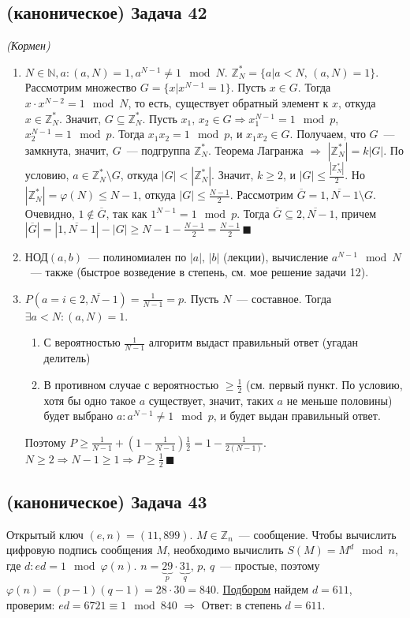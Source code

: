 \documentclass[a4paper]{article}
\newcommand{\ZZ}{\mathbb{Z}}
\newcommand{\NN}{\mathbb{N}}
\begin{document}
\subsection*{(каноническое) Задача 42}
{\em (Кормен)}
\begin{enumerate}
\item $N\in\NN,a\colon (a,N)=1, a^{N-1}\neq 1\mod N$. $\ZZ_N^*=\{a\big|a<N,\,(a,N)=1\}$. Рассмотрим множество $G=\{x\big|x^{N-1}=1\}$. Пусть $x\in G$. Тогда $x\cdot x^{N-2}=1\mod N$, то есть, существует обратный элемент к $x$, откуда $x\in \ZZ_N^*$. Значит, $G\subseteq \ZZ_N^*$. Пусть $x_1,\,x_2\in G\Rightarrow x_1^{N-1}=1\mod p$, $x_2^{N-1}=1\mod p$. Тогда $x_1x_2=1\mod p$, и $x_1x_2\in G$. Получаем, что $G$~--- замкнута, значит, $G$~--- подгруппа $\ZZ_N^*$. Теорема Лагранжа $\Rightarrow$ $|\ZZ_N^*|=k|G|$. По условию, $a\in\ZZ_N^*\setminus G$, откуда $|G|<|\ZZ_N^*|$. Значит, $k\geqslant 2$, и $|G|\leqslant \frac{|\ZZ_N^*|}{2}$. Но $|\ZZ_N^*|=\varphi(N)\leqslant N-1$, откуда $|G|\leqslant\frac{N-1}{2}$. Рассмотрим $\overline{G}=\overline{1,N-1}\setminus G$. Очевидно, $1\notin \overline{G}$, так как $1^{N-1}=1\mod p$. Тогда $\overline{G}\subseteq\overline{2,N-1}$, причем $|\overline{G}|=|\overline{1,N-1}|-|G|\geqslant N-1-\frac{N-1}{2}=\frac{N-1}{2}\,\blacksquare$
\item $\mbox{НОД}(a,b)$~--- полиномиален по $|a|,\,|b|$ (лекции), вычисление $a^{N-1}\mod N$~--- также (быстрое возведение в степень, см. мое решение задачи 12).
\item $P(a=i\in\overline{2,N-1})=\frac{1}{N-1}=p$. Пусть $N$~--- составное. Тогда $\exists a<N\colon (a,N)=1$.\begin{enumerate}
\item С вероятностью $\frac{1}{N-1}$ алгоритм выдаст правильный ответ (угадан делитель)
\item В противном случае с вероятностью $\geqslant \frac{1}{2}$ (см. первый пункт. По условию, хотя бы одно такое $a$ существует, значит, таких $a$ не меньше половины) будет выбрано $a\colon a^{N-1}\neq 1\mod p$, и будет выдан правильный ответ.
\end{enumerate}
Поэтому $P\geqslant \frac{1}{N-1}+(1-\frac{1}{N-1})\frac{1}{2}=1-\frac{1}{2(N-1)}$. $N\geqslant 2\Rightarrow N-1\geqslant 1\Rightarrow P\geqslant\frac{1}{2}\,\blacksquare$
\end{enumerate}
\subsection*{(каноническое) Задача 43}
Открытый ключ $(e,n)=(11, 899)$. $M\in\ZZ_n$~--- сообщение.\newline
Чтобы вычислить цифровую подпись сообщения $M$, необходимо вычислить $S(M)=M^d\mod n$,\newline
где $d\colon ed=1\mod \varphi(n)$. $n=\underbrace{29}_p\cdot \underbrace{31}_q$, $p,\,q$~--- простые, поэтому $\varphi(n)=(p-1)(q-1)=28\cdot 30=840$.\newline
\href{https://bitbucket.org/etoestja/inf/raw/HEAD/mipt/s4/AACM/A/43.py}{Подбором} найдем $d=611$, проверим: $ed=6721\equiv 1\mod 840$ $\Rightarrow$ Ответ: в степень $d=611$.
\end{document}
